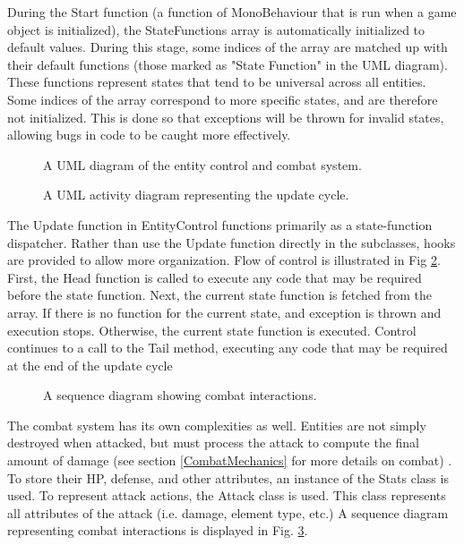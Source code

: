 \documentclass{article}
\begin{document}
During the Start function (a function of MonoBehaviour that is run when a game object is initialized), the StateFunctions array is automatically initialized to default values.  During this stage, some indices of the array are matched up with their default functions (those marked as "State Function" in the UML diagram).  These functions represent states that tend to be universal across all entities.  Some indices of the array correspond to more specific states, and are therefore not initialized.  This is done so that exceptions will be thrown for invalid states, allowing bugs in code to be caught more effectively.

\begin{figure}[h!]


\caption{A UML diagram of the entity control and combat system.}
\label{AI_Combat}
\end{figure}


\begin{figure}[h!]


\caption{A UML activity diagram representing the update cycle.}
\label{UpdateCycle}
\end{figure}

The Update function in EntityControl functions primarily as a state-function dispatcher.  Rather than use the Update function directly in the subclasses, hooks are provided to allow more organization.  Flow of control is illustrated in Fig \ref{UpdateCycle}.  First, the Head function is called to execute any code that may be required before the state function.  Next, the current state function is fetched from the array.  If there is no function for the current state, and exception is thrown and execution stops.  Otherwise, the current state function is executed.  Control continues to a call to the Tail method, executing any code that may be required at the end of the update cycle

\begin{figure}[h!]


\caption{A sequence diagram showing combat interactions.}
\label{CombatInteractions}

\end{figure}

The combat system has its own complexities as well.  Entities are not simply destroyed when attacked, but must process the attack to compute the final amount of damage (see section \ref{CombatMechanics} for more details on combat) .  To store their HP, defense, and other attributes, an instance of the Stats class is used.  To represent attack actions, the Attack class is used.  This class represents all attributes of the attack (i.e. damage, element type, etc.)  A sequence diagram representing combat interactions is displayed in Fig. \ref{CombatInteractions}.
\end{document}
